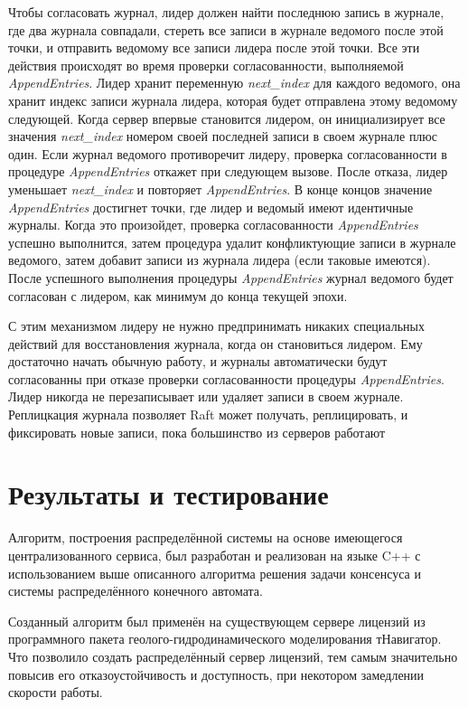 \documentclass[subf, href, colorlinks=true, 14pt,
times, mtpro, specialist]{disser}
\theoremstyle{definition}
\begin{document}
Чтобы согласовать журнал, лидер должен найти последнюю запись в журнале, где два журнала совпадали, стереть все записи в журнале ведомого после этой точки, и отправить ведомому все записи лидера после этой точки. Все эти действия происходят во время проверки согласованности, выполняемой \textit{AppendEntries}. Лидер хранит переменную \textit{next\_index} для каждого ведомого, она хранит индекс записи журнала лидера, которая будет отправлена этому ведомому следующей. Когда сервер впервые становится лидером, он инициализирует все значения \textit{next\_index} номером своей последней записи в своем журнале плюс один. Если журнал ведомого противоречит лидеру, проверка согласованности в процедуре \textit{AppendEntries} откажет при следующем вызове. После отказа, лидер уменьшает \textit{next\_index} и повторяет \textit{AppendEntries}. В конце концов значение \textit{AppendEntries} достигнет точки, где лидер и ведомый имеют идентичные журналы. Когда это произойдет, проверка согласованности \textit{AppendEntries} успешно выполнится, затем процедура удалит конфликтующие записи в журнале ведомого, затем добавит записи из журнала лидера (если таковые имеются). После успешного выполнения процедуры \textit{AppendEntries} журнал ведомого будет согласован с лидером, как минимум до конца текущей эпохи.

С этим механизмом лидеру не нужно предпринимать никаких специальных действий для восстановления журнала, когда он становиться лидером. Ему достаточно начать обычную работу, и журналы автоматически будут согласованны при отказе проверки согласованности процедуры \textit{AppendEntries}. Лидер никогда не перезаписывает или удаляет записи в своем журнале.
Реплицкация журнала позволяет Raft может получать, реплицировать, и фиксировать новые записи, пока большинство из серверов работают

\section{Результаты и тестирование}

Алгоритм, построения распределённой системы на основе имеющегося централизованного сервиса, был разработан и реализован на языке C++ с использованием выше описанного алгоритма решения задачи консенсуса и системы распределённого конечного автомата. 

Созданный алгоритм был применён на существующем сервере лицензий из программного пакета геолого-гидродинамического моделирования тНавигатор. Что позволило создать распределённый сервер лицензий, тем самым значительно повысив его отказоустойчивость и доступность, при некотором замедлении скорости работы.
\end{document}
